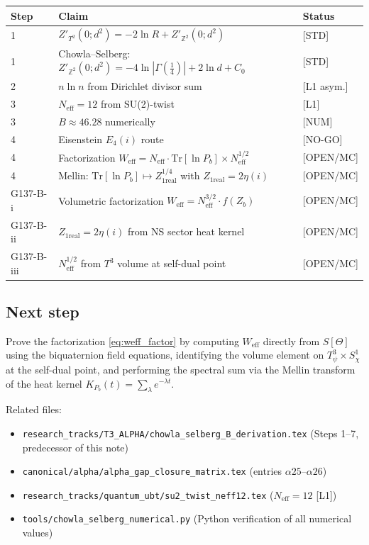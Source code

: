 \documentclass[12pt,a4paper]{article}
\begin{document}
\begin{center}
\begin{tabular}{lll}
\toprule
\textbf{Step} & \textbf{Claim} & \textbf{Status} \\
\midrule
1 & $Z'_{T^2}(0; d^2) = -2\ln R + Z'_{\mathbb{Z}^2}(0; d^2)$ & [STD] \\
1 & Chowla--Selberg: $Z'_{\mathbb{Z}^2}(0; d^2) = -4\ln|\Gamma(\tfrac14)| + 2\ln d + C_0$ & [STD] \\
2 & $n\ln n$ from Dirichlet divisor sum & [L1 asym.] \\
3 & $N_{\mathrm{eff}} = 12$ from SU(2)-twist & [L1] \\
3 & $B \approx 46.28$ numerically & [NUM] \\
4 & Eisenstein $E_4(i)$ route & [NO-GO] \\
4 & Factorization $W_{\mathrm{eff}} = N_{\mathrm{eff}}\cdot\mathrm{Tr}[\ln P_b]\times N_{\mathrm{eff}}^{1/2}$ & [OPEN/MC] \\
4 & Mellin: $\mathrm{Tr}[\ln P_b] \mapsto Z_{1\mathrm{real}}^{1/4}$ with $Z_{1\mathrm{real}} = 2\eta(i)$ & [OPEN/MC] \\
G137-B-i & Volumetric factorization $W_{\mathrm{eff}} = N_{\mathrm{eff}}^{3/2}\!\cdot f(Z_b)$ & [OPEN/MC] \\
G137-B-ii & $Z_{1\mathrm{real}} = 2\eta(i)$ from NS sector heat kernel & [OPEN/MC] \\
G137-B-iii & $N_{\mathrm{eff}}^{1/2}$ from $T^3$ volume at self-dual point & [OPEN/MC] \\
\bottomrule
\end{tabular}
\end{center}

\subsection*{Next step}

Prove the factorization \eqref{eq:weff_factor} by computing $W_{\mathrm{eff}}$
directly from $S[\Theta]$ using the biquaternion field equations,
identifying the volume element on $T^3_\psi\times S^1_\chi$ at the
self-dual point, and performing the spectral sum via the Mellin transform
of the heat kernel $K_{P_b}(t) = \sum_\lambda e^{-\lambda t}$.

Related files:
\begin{itemize}
\item \texttt{research\_tracks/T3\_ALPHA/chowla\_selberg\_B\_derivation.tex}
  (Steps 1--7, predecessor of this note)
\item \texttt{canonical/alpha/alpha\_gap\_closure\_matrix.tex}
  (entries $\alpha25$--$\alpha26$)
\item \texttt{research\_tracks/quantum\_ubt/su2\_twist\_neff12.tex}
  ($N_{\mathrm{eff}} = 12$ [L1])
\item \texttt{tools/chowla\_selberg\_numerical.py}
  (Python verification of all numerical values)
\end{itemize}
\end{document}

